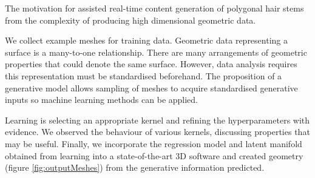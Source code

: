 \documentclass[ %
author={Dillon Keith Diep},
supervisor={Dr. Carl Henrik Ek},
degree={MEng},
title={ART-CG Hair:},
subtitle={Assisted Real-time Content Generation of Stylised Virtual Hair},
type={Research},
year={2017} ]{dissertation}
\begin{document}
The motivation for assisted real-time content generation of polygonal hair stems from the complexity of producing high dimensional geometric data.

We collect example meshes for training data. Geometric data representing a surface is a many-to-one relationship. There are many arrangements of geometric properties that could denote the same surface. However, data analysis requires this representation must be standardised beforehand. The proposition of a generative model allows sampling of meshes to acquire standardised generative inputs so machine learning methods can be applied.

Learning is selecting an appropriate kernel and refining the hyperparameters with evidence. We observed the behaviour of various kernels, discussing properties that may be useful. Finally, we incorporate the regression model and latent manifold obtained from learning into a state-of-the-art 3D software and created geometry (figure \ref{fig:outputMeshes}) from the generative information predicted.
\end{document}
